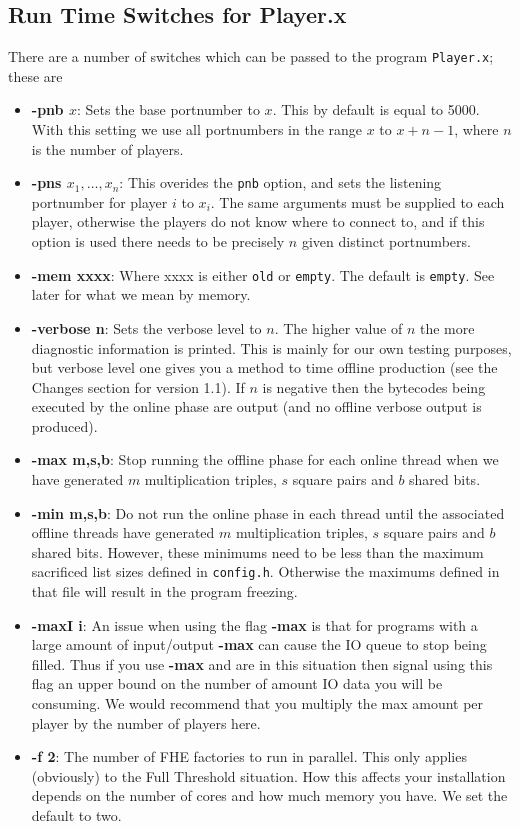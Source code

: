 \subsection{Run Time Switches for Player.x}
There are a number of switches which can be passed to the
program \verb+Player.x+; these are
\begin{itemize}
\item {\bf -pnb $x$}: Sets the base portnumber to $x$. This by
default is equal to 5000. With this setting we use all
portnumbers in the range $x$ to $x+n-1$,
where $n$ is the number of players. 
\item {\bf -pns $x_1,\ldots,x_n$}: This overides the \verb+pnb+
option, and sets the listening portnumber for player
$i$ to $x_i$.
The same arguments must be supplied to each player, otherwise
the players do not know where to connect to, and if this
option is used there needs to be precisely $n$ given
distinct portnumbers.
\item {\bf -mem xxxx}: Where xxxx is either \verb+old+
or \verb+empty+. The default is \verb+empty+.
See later for what we mean by memory.
\item {\bf -verbose n}: Sets the verbose level to $n$. The higher value
of $n$ the more diagnostic information is printed. This is mainly
for our own testing purposes, but verbose level one gives you a method
to time offline production (see the Changes section for version 1.1).
If $n$ is negative then the bytecodes being executed by the online
phase are output (and no offline verbose output is produced).
\item {\bf -max m,s,b}: Stop running the offline phase for each online
thread when we have generated $m$ multiplication triples, $s$ square
pairs and $b$ shared bits.
\item {\bf -min m,s,b}: Do not run the online phase in each thread 
until the associated offline threads have generated $m$ multiplication 
triples, $s$ square pairs and $b$ shared bits.
However, these minimums need to be less than the maximum sacrificed
list sizes defined in \verb+config.h+. Otherwise the maximums
defined in that file will result in the program freezing.
\item {\bf -maxI i}: An issue when using the flag {\bf -max} is that
for programs with a large amount of input/output {\bf -max} can cause the
IO queue to stop being filled.
Thus if you use {\bf -max} and are in this situation then signal
using this flag an upper bound on the number of amount IO data you
will be consuming. We would recommend that you multiply the max amount
per player by the number of players here.
\item {\bf -f 2}: The number of FHE factories to run in parallel.
This only applies (obviously) to the Full Threshold situation.
How this affects your installation depends on the number of cores
and how much memory you have. We set the default to two.
\end{itemize}
